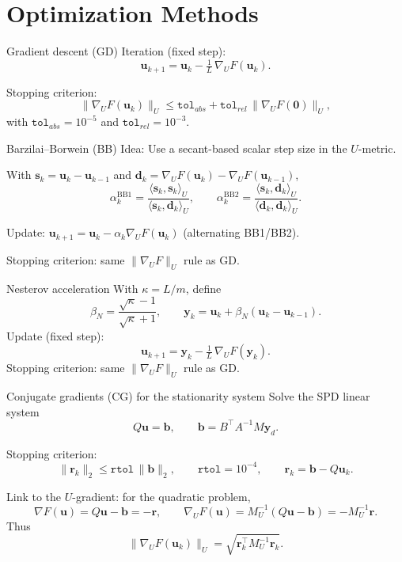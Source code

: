 \documentclass[aspectratio=169,11pt]{beamer}
\begin{document}
\section{Optimization Methods}

\begin{frame}{Gradient descent (GD)}
Iteration (fixed step):
\[
  \bm u_{k+1}=\bm u_k-\tfrac{1}{L}\,\nabla_U F(\bm u_k).
\]

\medskip
Stopping criterion:
\[
  \|\nabla_U F(\bm u_k)\|_U \le \texttt{tol}_{abs}+\texttt{tol}_{rel}\,\|\nabla_U F(\bm 0)\|_U,
\]
with $\texttt{tol}_{abs}=10^{-5}$ and $\texttt{tol}_{rel}=10^{-3}$.
\end{frame}

\begin{frame}{Barzilai--Borwein (BB)}
Idea: Use a secant-based scalar step size in the $U$-metric.

\medskip
With $\bm s_k=\bm u_k-\bm u_{k-1}$ and $\bm d_k=\nabla_U F(\bm u_k)-\nabla_U F(\bm u_{k-1})$,
\[
  \alpha_k^{\mathrm{BB1}}=\frac{\langle \bm s_k,\bm s_k\rangle_U}{\langle \bm s_k,\bm d_k\rangle_U},
  \qquad
  \alpha_k^{\mathrm{BB2}}=\frac{\langle \bm s_k,\bm d_k\rangle_U}{\langle \bm d_k,\bm d_k\rangle_U}.
\]

\medskip
Update: $\bm u_{k+1}=\bm u_k-\alpha_k\nabla_U F(\bm u_k)$ (alternating BB1/BB2).

\medskip
Stopping criterion: same $\|\nabla_U F\|_U$ rule as GD.
\end{frame}

\begin{frame}{Nesterov acceleration}
With $\kappa=L/m$, define
\[
  \beta_N=\frac{\sqrt{\kappa}-1}{\sqrt{\kappa}+1},\qquad
  \bm y_k=\bm u_k+\beta_N(\bm u_k-\bm u_{k-1}).
\]
Update (fixed step):
\[
  \bm u_{k+1}=\bm y_k-\tfrac{1}{L}\,\nabla_U F(\bm y_k).
\]
Stopping criterion: same $\|\nabla_U F\|_U$ rule as GD.
\end{frame}

\begin{frame}{Conjugate gradients (CG) for the stationarity system}
Solve the SPD linear system
\[
  Q\bm u=\bm b,\qquad \bm b=B^\top A^{-1}M\bm y_d.
\]

Stopping criterion:
\[
  \|\bm r_k\|_2\le \texttt{rtol}\,\|\bm b\|_2,\qquad \texttt{rtol}=10^{-4},\qquad \bm r_k=\bm b-Q\bm u_k.
\]

\medskip
Link to the $U$-gradient: for the quadratic problem,
\[
  \nabla F(\bm u)=Q\bm u-\bm b=-\bm r,\qquad
  \nabla_U F(\bm u)=M_U^{-1}(Q\bm u-\bm b)=-M_U^{-1}\bm r.
\]
Thus
\[
  \|\nabla_U F(\bm u_k)\|_U = \sqrt{\bm r_k^\top M_U^{-1}\bm r_k}.
\]
\end{frame}
\end{document}
